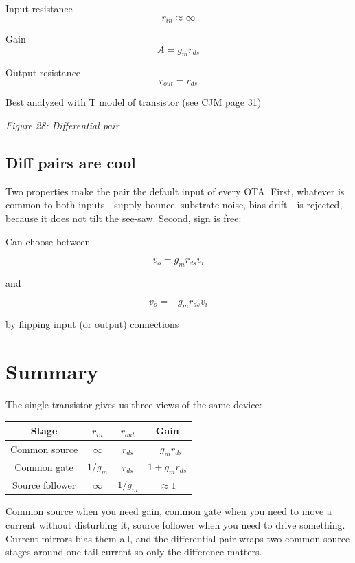 Input resistance \[r_{in} \approx \infty\]

Gain \[ A  = g_m r_{ds} \]

Output resistance \[ r_{out} = r_{ds}\]

Best analyzed with T model of transistor (see CJM page 31)


{
\centering
{}
}

\emph{Figure 28: Differential pair}

\subsection{Diff pairs are cool}\label{diff-pairs-are-cool}

Two properties make the pair the default input of every OTA. First,
whatever is common to both inputs - supply bounce, substrate noise, bias
drift - is rejected, because it does not tilt the see-saw. Second, sign
is free:

Can choose between

\[ v_o = g_m r_{ds} v_i\]

and

\[ v_o = -g_m r_{ds} v_i\]

by flipping input (or output) connections

\section{Summary}\label{summary}

The single transistor gives us three views of the same device:

\begin{longtable}[]{@{}cccc@{}}
\toprule\noalign{}
Stage & \(r_{in}\) & \(r_{out}\) & Gain \\
\midrule\noalign{}
\endhead
\bottomrule\noalign{}
\endlastfoot
Common source & \(\infty\) & \(r_{ds}\) & \(-g_m r_{ds}\) \\
Common gate & \(1/g_m\) & \(r_{ds}\) & \(1 + g_m r_{ds}\) \\
Source follower & \(\infty\) & \(1/g_m\) & \(\approx 1\) \\
\end{longtable}

Common source when you need gain, common gate when you need to move a
current without disturbing it, source follower when you need to drive
something. Current mirrors bias them all, and the differential pair
wraps two common source stages around one tail current so only the
difference matters.


